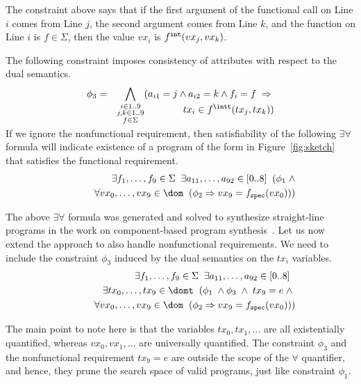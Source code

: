 \documentclass[preprint]{sig-alternate-05-2015}
\def\int{{\tt{int}}}
\def\spec{{\tt{spec}}}
\def\Sig{{\Sigma}}
\begin{document}
{\smallskip\noindent
The constraint above says that if
the first argument of the functional call on Line $i$ comes from Line $j$,
the second argument comes from Line $k$, and
the function on Line $i$ is $f\in\Sig$, then
the value $vx_i$ is $f^\int(vx_j,vx_k)$.

The following constraint imposes consistency of attributes with respect to the dual semantics.
\begin{eqnarray*}
  \phi_3 & = & \bigwedge_{\substack{i\in 1..9\\j,k\in 1..9\\ f\in\Sig}} (a_{i1} = j \wedge a_{i2}=k \wedge f_i=f\;\Rightarrow\;
      \\*[-2.5em] & & \qquad\qquad\qquad tx_i\in f^\intt(tx_j,tx_k))
\end{eqnarray*}

\smallskip\noindent
If we ignore the nonfunctional requirement, then satisfiability
of the following $\exists\forall$ formula will indicate
existence of a program of the form in Figure~\ref{fig:sketch}
that satisfies the functional requirement.
\begin{eqnarray*}
  &&\exists{f_1,\ldots,f_9}\in\Sig\;\;
  \exists{a_{11},\ldots,a_{92}}\in [0..8]\;\;
  (\phi_1 \; \wedge
  \\ && \qquad
  \forall{vx_0,\ldots,vx_9}\in\dom\;\;(\phi_2 \Rightarrow vx_9 = f_\spec(vx_0)))
\end{eqnarray*}

The above $\exists\forall$ formula was generated and solved
to synthesize straight-line programs in the work on
component-based program synthesis~\cite{bitvector}.
Let us now extend the approach to also handle nonfunctional
requirements.
We need to include the constraint $\phi_3$ induced by the dual
semantics on the $tx_i$ variables.
\begin{eqnarray*}
  &&\exists{f_1,\ldots,f_9}\in\Sig\;\;
  \exists{a_{11},\ldots,a_{92}}\in [0..8]\;\;
  \\ &&\quad
  \exists{tx_0,\ldots,tx_9}\in\domt\;\;
  (\phi_1 \; \wedge
  \phi_3 \;\wedge\; tx_9 = e \;\wedge\;
  \\ && \qquad
  \forall{vx_0,\ldots,vx_9}\in\dom\;\;(\phi_2 \Rightarrow vx_9 = f_\spec(vx_0)))
\end{eqnarray*}

The main point to note here is that the variables
$tx_0,tx_1,\ldots$ are all existentially quantified,
whereas $vx_0,vx_1,\ldots$ are universally quantified.
The constraint $\phi_3$ and the nonfunctional requirement
$tx_9=e$ are outside the scope of the $\forall$ quantifier,
and hence, they prune the search space of valid programs,
just like constraint $\phi_1$.

}
\end{document}
